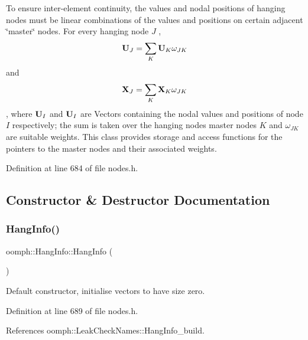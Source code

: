 To ensure inter-\/element continuity, the values and nodal positions of hanging nodes must be linear combinations of the values and positions on certain adjacent \char`\"{}master\char`\"{} nodes. For every hanging node $ J $ , \[ {\bf U}_J = \sum_{K} {\bf U}_{K} \omega_{JK} \] and \[ {\bf X}_J = \sum_{K} {\bf X}_{K} \omega_{JK} \], where $ {\bf U}_I $ and $ {\bf U}_I $ are Vectors containing the nodal values and positions of node $ I $ respectively; the sum is taken over the hanging node\textquotesingle{}s master nodes $ K $ and $ \omega_{JK} $ are suitable weights. This class provides storage and access functions for the pointers to the master nodes and their associated weights. 

Definition at line 684 of file nodes.\+h.



\subsection{Constructor \& Destructor Documentation}
\mbox{\label{classoomph_1_1HangInfo_a23d3ff929ac052ecb401e2a929e8ca64}} 
\subsubsection{\texorpdfstring{Hang\+Info()}{HangInfo()}\hspace{0.1cm}{\footnotesize\ttfamily [1/3]}}
{\footnotesize\ttfamily oomph\+::\+Hang\+Info\+::\+Hang\+Info (\begin{DoxyParamCaption}{ }\end{DoxyParamCaption})\hspace{0.3cm}{\ttfamily [inline]}}



Default constructor, initialise vectors to have size zero. 



Definition at line 689 of file nodes.\+h.



References oomph\+::\+Leak\+Check\+Names\+::\+Hang\+Info\+\_\+build.

\mbox{\label{classoomph_1_1HangInfo_a72416a50e81cf0646aed5501c8949bf1}} 

